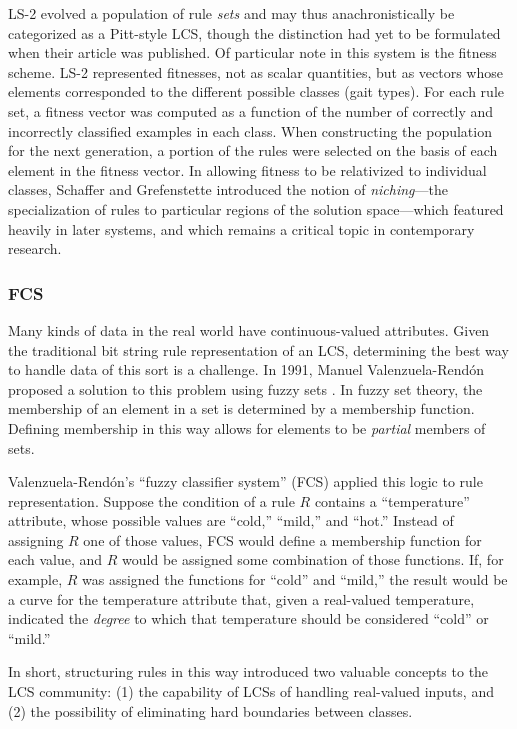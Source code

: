 \documentclass[11pt]{article}
\begin{document}
LS-2 evolved a population of rule \emph{sets} and may thus anachronistically be categorized as a Pitt-style LCS, though the distinction had yet to be formulated when their article was published. Of particular note in this system is the fitness scheme. LS-2 represented fitnesses, not as scalar quantities, but as vectors whose elements corresponded to the different possible classes (gait types). For each rule set, a fitness vector was computed as a function of the number of correctly and incorrectly classified examples in each class. When constructing the population for the next generation, a portion of the rules were selected on the basis of each element in the fitness vector. In allowing fitness to be relativized to individual classes, Schaffer and Grefenstette introduced the notion of \emph{niching}---the specialization of rules to particular regions of the solution space---which  featured heavily in later systems, and which remains a critical topic in contemporary research.

\subsubsection{FCS}

Many kinds of data in the real world have continuous-valued attributes. Given the traditional bit string rule representation of an LCS, determining the best way to handle data of this sort is a challenge. In 1991, Manuel Valenzuela-Rend\'on proposed a solution to this problem using fuzzy sets \cite{manuel_valenzuela-rendon_fuzzy_1991}. In fuzzy set theory, the membership of an element in a set is determined by a membership function. Defining membership in this way allows for elements to be \emph{partial} members of sets.

Valenzuela-Rend\'on's ``fuzzy classifier system'' (FCS) applied this logic to rule representation. Suppose the condition of a rule $R$ contains a ``temperature'' attribute, whose possible values are ``cold,'' ``mild,'' and ``hot.'' Instead of assigning $R$ one of those values, FCS would define a membership function for each value, and $R$ would be assigned some combination of those functions. If, for example, $R$ was assigned the functions for ``cold'' and ``mild,'' the result would be a curve for the temperature attribute that, given a real-valued temperature, indicated the \emph{degree} to which that temperature should be considered ``cold'' or ``mild.''

In short, structuring rules in this way introduced two valuable concepts to the LCS community: (1) the capability of LCSs of handling real-valued inputs, and (2) the possibility of eliminating hard boundaries between classes.
\end{document}
